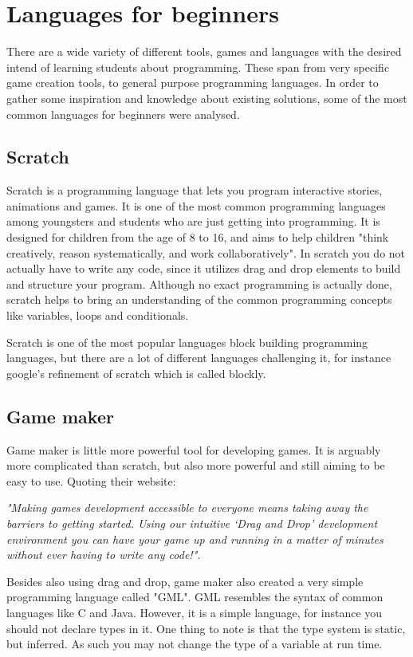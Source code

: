 \section{Languages for beginners}

There are a wide variety of different tools, games and languages with the desired intend of learning students about programming. 
These span from very specific game creation tools, to general purpose programming languages. 
In order to gather some inspiration and knowledge about existing solutions, some of the most common languages for beginners were analysed.

\subsection{Scratch}
Scratch is a programming language that lets you program interactive stories, animations and games. 
It is one of the most common programming languages among youngsters and students who are just getting into programming. 
It is designed for children from the age of 8 to 16, and aims to help children "think creatively, reason systematically, and work collaboratively". 
In scratch you do not actually have to write any code, since it utilizes drag and drop elements to build and structure your program. Although no exact programming is actually done, scratch helps to bring an understanding of the common programming concepts like variables, loops and conditionals.\cite{ScratchWebsite}

Scratch is one of the most popular languages block building programming languages, but there are a lot of different languages challenging it, for instance google's refinement of scratch which is called blockly.\cite{Blockly}

\subsection{Game maker}
Game maker is little more powerful tool for developing games. It is arguably more complicated than scratch, but also more powerful and still aiming to be easy to use. 
Quoting their website: 

\textit{"Making games development accessible to everyone means taking away the barriers to getting started. Using our intuitive ‘Drag and Drop’ development environment you can have your game up and running in a matter of minutes without ever having to write any code!".}\cite{GameMaker}
 
Besides also using drag and drop, game maker also created a very simple programming language called "GML". 
GML resembles the syntax of common languages like C and Java. 
However, it is a simple language, for instance you should not declare types in it. 
One thing to note is that the type system is static, but inferred. 
As such you may not change the type of a variable at run time.\cite{GML}

